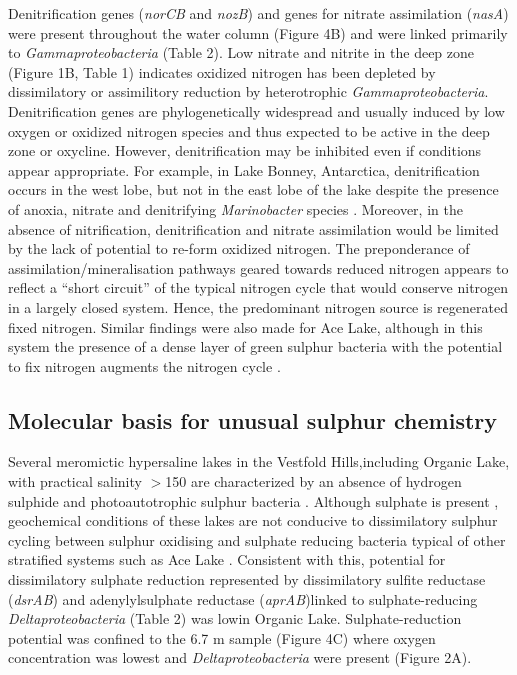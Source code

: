 Denitrification genes (\emph{norCB} and \emph{nozB}) and genes for nitrate assimilation (\emph{nasA}) were present throughout the water column (Figure 4B) and were linked primarily to \emph{Gammaproteobacteria} (Table 2). 
Low nitrate and nitrite in the deep zone (Figure 1B, Table 1) indicates oxidized nitrogen has been depleted by dissimilatory or assimilitory reduction by heterotrophic \emph{Gammaproteobacteria}. 
Denitrification genes are phylogenetically widespread and usually induced by low oxygen or oxidized nitrogen species \cite{Kraft2011} and thus expected to be active in the deep zone or oxycline. 
However, denitrification may be inhibited even if conditions appear appropriate. 
For example, in Lake Bonney, Antarctica, denitrification occurs in the west lobe, but not in the east lobe of the lake despite the presence of anoxia, nitrate and denitrifying \emph{Marinobacter} species \cite{Ward1997, Ward2005}.
 Moreover, in the absence of nitrification, denitrification and nitrate assimilation would be limited by the lack of potential to re-form oxidized nitrogen. 
The preponderance of assimilation/mineralisation pathways geared towards reduced nitrogen appears to reflect a ``short circuit'' of the typical nitrogen cycle that would conserve nitrogen in a largely closed system. 
Hence, the predominant nitrogen source is regenerated fixed nitrogen.
Similar findings were also made for Ace Lake, although in this system the presence of a dense layer of green sulphur bacteria with the potential to fix nitrogen augments the nitrogen cycle \cite{Lauro2011}. 

\subsection{Molecular basis for unusual sulphur chemistry}
Several meromictic hypersaline lakes in the Vestfold Hills,including Organic Lake, with practical salinity $>$150 are characterized by an absence of hydrogen sulphide and photoautotrophic sulphur bacteria \cite{Burke1988}. 
Although sulphate is present \cite{Franzmann1987b}, geochemical conditions of these lakes are not conducive to dissimilatory sulphur cycling between sulphur oxidising and sulphate reducing bacteria typical of other stratified systems such as Ace Lake \cite{Ng2010a, Lauro2011}. 
Consistent with this, potential for dissimilatory sulphate reduction represented by dissimilatory sulfite reductase (\emph{dsrAB}) and adenylylsulphate reductase (\emph{aprAB})linked to sulphate-reducing \emph{Deltaproteobacteria} (Table 2) was lowin Organic Lake. 
Sulphate-reduction potential was confined to the 6.7 m sample (Figure 4C) where oxygen concentration was lowest and \emph{Deltaproteobacteria} were present (Figure 2A).

